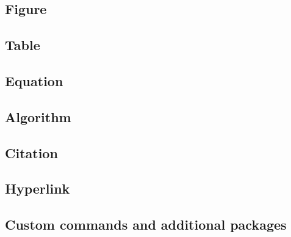 \subsection{Figure}
\subsection{Table}
\subsection{Equation}
\subsection{Algorithm}
\subsection{Citation}
\subsection{Hyperlink}
\subsection{Custom commands and additional packages}

\clearpage
